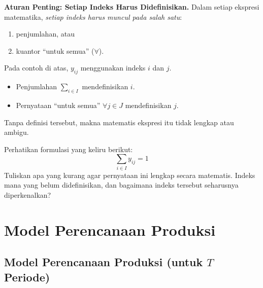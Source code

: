 \medskip
\noindent
\textbf{Aturan Penting: Setiap Indeks Harus Didefinisikan.}  
Dalam setiap ekspresi matematika, \emph{setiap indeks harus muncul pada salah satu}:
\begin{enumerate}
    \item penjumlahan, atau  
    \item kuantor ``untuk semua'' (\(\forall\)).
\end{enumerate}

Pada contoh di atas, \( y_{ij} \) menggunakan indeks \(i\) dan \(j\).  
\begin{itemize}
    \item Penjumlahan \(\sum_{i \in I}\) mendefinisikan \(i\).  
    \item Pernyataan ``untuk semua'' \(\forall j \in J\) mendefinisikan \(j\).
\end{itemize}
Tanpa definisi tersebut, makna matematis ekspresi itu tidak lengkap atau ambigu.

\begin{learningcheckpoint}[label={lc:missing-index}]
Perhatikan formulasi yang keliru berikut:
\[
\sum_{i \in I} y_{ij} = 1
\]
Tuliskan apa yang kurang agar pernyataan ini lengkap secara matematis. Indeks mana yang belum didefinisikan, dan bagaimana indeks tersebut seharusnya diperkenalkan?
\end{learningcheckpoint}

\section{Model Perencanaan Produksi}
\label{sec:production-planning}

\subsection*{Model Perencanaan Produksi (untuk \(T\) Periode)}

